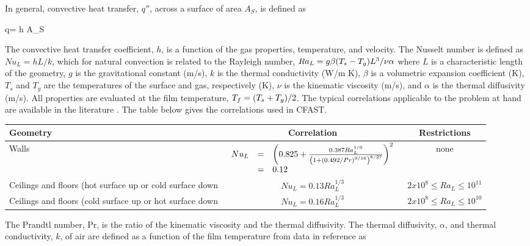 In general, convective heat transfer, $q\dprime$, across a surface of area
$A_S$, is defined as

\be q\dprime = h A_S  \ee

The convective heat transfer coefficient, $h$, is a function of the gas properties, temperature, and velocity. The Nusselt number is defined as $Nu_L = h L / k$, which for natural convection is related to the Rayleigh number, $Ra_L = g \beta { \left( {T_s - T_g} \right) }L^3 / \nu \alpha$ where $L$ is a characteristic length of the geometry, $g$ is the gravitational constant (m/s), $k$ is the thermal conductivity (W/m K), $\beta$ is a volumetric expansion coefficient (K), $T_s$ and $T_g$ are the temperatures of the surface and gas, respectively (K), $\nu$ is the kinematic viscosity (m/s), and $\alpha$ is the thermal diffusivity (m/s).  All properties are evaluated at the film temperature, $T_f = { \left( {T_s + T_g} \right) }/2$.  The typical correlations applicable to the problem at hand are available in the literature  \cite{Atreya:2003}. The table below gives the correlations used in CFAST.

\begin{table}[h!]
\begin{center}
\begin{tabular}{| p{1.5in} | c | c |}
\hline
Geometry & Correlation & Restrictions \\
 \hline
 Walls & {$\begin{array}{lll} Nu_L &=& { \left( {0.825 + \frac{0.387 Ra_L^{1/6}}{{ \left( {1 + { \left( {0.492/Pr} \right) }^{9/16}} \right) }^{8/27}}} \right) }^2  \\ &=&0.12 \end{array}$}  & none \\
Ceilings and floors (hot surface up or cold surface down & {$Nu_L = 0.13 Ra_L^{1/3}$} & $2 x 10^8 \le Ra_L \le 10^{11}$ \\

 Ceilings and floors (cold surface up or hot surface down & {$Nu_L = 0.16 Ra_L^{1/3}$} & $2 x 10^8 \le Ra_L \le 10^{10}$ \\
 \hline
\end{tabular}
\end{center}
\end{table}

The Prandtl number, Pr, is the ratio of the kinematic viscosity and the thermal diffusivity. The thermal diffusivity, $\alpha$, and thermal conductivity, $k$, of air are defined as a function of the film temperature from data in reference \cite{Atreya:2003} as

